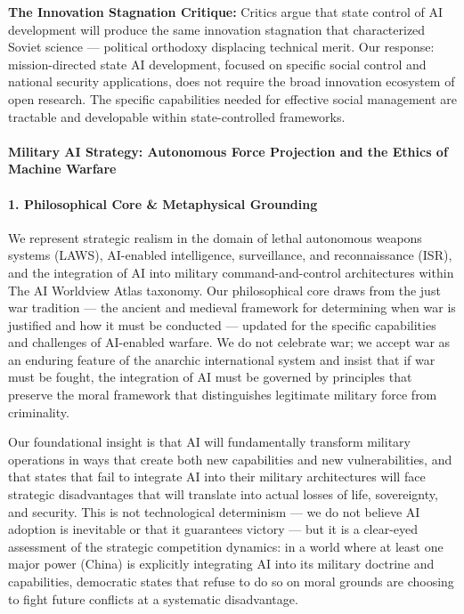 \textbf{The Innovation Stagnation Critique:} Critics argue that state
control of AI development will produce the same innovation stagnation
that characterized Soviet science --- political orthodoxy displacing
technical merit. Our response: mission-directed state AI development,
focused on specific social control and national security applications,
does not require the broad innovation ecosystem of open research. The
specific capabilities needed for effective social management are
tractable and developable within state-controlled frameworks.

\paragraph{Military AI Strategy: Autonomous Force Projection and the
Ethics of Machine
Warfare}\label{military-ai-strategy-autonomous-force-projection-and-the-ethics-of-machine-warfare}

\paragraph{1. Philosophical Core \& Metaphysical
Grounding}\label{philosophical-core-metaphysical-grounding-23}

We represent strategic realism in the domain of lethal autonomous
weapons systems (LAWS), AI-enabled intelligence, surveillance, and
reconnaissance (ISR), and the integration of AI into military
command-and-control architectures within The AI Worldview Atlas
taxonomy. Our philosophical core draws from the just war tradition ---
the ancient and medieval framework for determining when war is justified
and how it must be conducted --- updated for the specific capabilities
and challenges of AI-enabled warfare. We do not celebrate war; we accept
war as an enduring feature of the anarchic international system and
insist that if war must be fought, the integration of AI must be
governed by principles that preserve the moral framework that
distinguishes legitimate military force from criminality.

Our foundational insight is that AI will fundamentally transform
military operations in ways that create both new capabilities and new
vulnerabilities, and that states that fail to integrate AI into their
military architectures will face strategic disadvantages that will
translate into actual losses of life, sovereignty, and security. This is
not technological determinism --- we do not believe AI adoption is
inevitable or that it guarantees victory --- but it is a clear-eyed
assessment of the strategic competition dynamics: in a world where at
least one major power (China) is explicitly integrating AI into its
military doctrine and capabilities, democratic states that refuse to do
so on moral grounds are choosing to fight future conflicts at a
systematic disadvantage.

